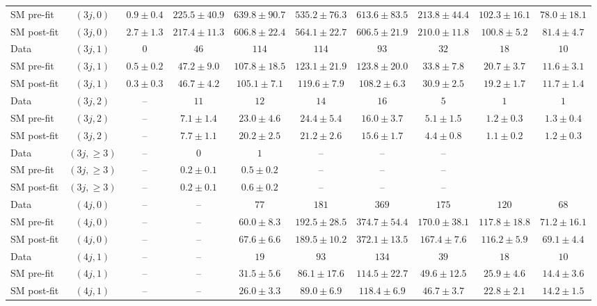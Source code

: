 {\begin{table*}[h!]
{\begin{tabular}{lccccccccc}
 SM pre-fit & $(3j,0)$ & $0.9\pm0.4$ & $225.5\pm40.9$ & $639.8\pm90.7$ & $535.2\pm76.3$ & $613.6\pm83.5$ & $213.8\pm44.4$ & $102.3\pm16.1$ & $78.0\pm18.1$ \\[0.5ex]
 SM post-fit & $(3j,0)$ & $2.7\pm1.3$ & $217.4\pm11.3$ & $606.8\pm22.4$ & $564.1\pm22.7$ & $606.5\pm21.9$ & $210.0\pm11.8$ & $100.8\pm5.2$ & $81.4\pm4.7$ \\[0.5ex]
 Data & $(3j,1)$ & $0$ & $46$ & $114$ & $114$ & $93$ & $32$ & $18$ & $10$ \\[0.5ex]
 SM pre-fit & $(3j,1)$ & $0.5\pm0.2$ & $47.2\pm9.0$ & $107.8\pm18.5$ & $123.1\pm21.9$ & $123.8\pm20.0$ & $33.8\pm7.8$ & $20.7\pm3.7$ & $11.6\pm3.1$ \\[0.5ex]
 SM post-fit & $(3j,1)$ & $0.3\pm0.3$ & $46.7\pm4.2$ & $105.1\pm7.1$ & $119.6\pm7.9$ & $108.2\pm6.3$ & $30.9\pm2.5$ & $19.2\pm1.7$ & $11.7\pm1.4$ \\[0.5ex]
 Data & $(3j,2)$ & -- & $11$ & $12$ & $14$ & $16$ & $5$ & $1$ & $1$ \\[0.5ex]
 SM pre-fit & $(3j,2)$ & -- & $7.1\pm1.4$ & $23.0\pm4.6$ & $24.4\pm5.4$ & $16.0\pm3.7$ & $5.1\pm1.5$ & $1.2\pm0.3$ & $1.3\pm0.4$ \\[0.5ex]
 SM post-fit & $(3j,2)$ & -- & $7.7\pm1.1$ & $20.2\pm2.5$ & $21.2\pm2.6$ & $15.6\pm1.7$ & $4.4\pm0.8$ & $1.1\pm0.2$ & $1.2\pm0.3$ \\[0.5ex]
 Data & $(3j,\geq 3)$ & -- & $0$ & $1$ & -- & -- & -- \\[0.5ex]
 SM pre-fit & $(3j,\geq 3)$ & -- & $0.2\pm0.1$ & $0.5\pm0.2$ & -- & -- & -- \\[0.5ex]
 SM post-fit & $(3j,\geq 3)$ & -- & $0.2\pm0.1$ & $0.6\pm0.2$ & -- & -- & -- \\[0.5ex]
 Data & $(4j,0)$ & -- & -- & $77$ & $181$ & $369$ & $175$ & $120$ & $68$ \\[0.5ex]
 SM pre-fit & $(4j,0)$ & -- & -- & $60.0\pm8.3$ & $192.5\pm28.5$ & $374.7\pm54.4$ & $170.0\pm38.1$ & $117.8\pm18.8$ & $71.2\pm16.1$ \\[0.5ex]
 SM post-fit & $(4j,0)$ & -- & -- & $67.6\pm6.6$ & $189.5\pm10.2$ & $372.1\pm13.5$ & $167.4\pm7.6$ & $116.2\pm5.9$ & $69.1\pm4.4$ \\[0.5ex]
 Data & $(4j,1)$ & -- & -- & $19$ & $93$ & $134$ & $39$ & $18$ & $10$ \\[0.5ex]
 SM pre-fit & $(4j,1)$ & -- & -- & $31.5\pm5.6$ & $86.1\pm17.6$ & $114.5\pm22.7$ & $49.6\pm12.5$ & $25.9\pm4.6$ & $14.4\pm3.6$ \\[0.5ex]
 SM post-fit & $(4j,1)$ & -- & -- & $26.0\pm3.3$ & $89.0\pm6.9$ & $118.4\pm6.9$ & $46.7\pm3.7$ & $22.8\pm2.1$ & $14.2\pm1.5$ \\[0.5ex]

\end{tabular}}
\end{table*}}
